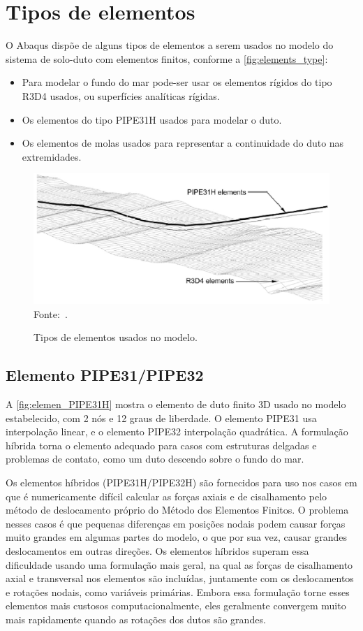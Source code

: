 \section{Tipos de elementos}

O Abaqus dispõe de alguns tipos de elementos a serem usados no modelo do sistema de solo-duto com elementos finitos, conforme a \autoref{fig:elements_type}:

\begin{itemize}
    \item Para modelar o fundo do mar pode-ser usar os elementos rígidos do tipo R3D4 usados, ou superfícies analíticas rígidas.
    \item Os elementos do tipo PIPE31H usados para modelar o duto.
    \item Os elementos de molas usados para representar a continuidade do duto nas extremidades.
\end{itemize}

\begin{figure}[th!]
    \centering
    \caption{Tipos de elementos usados no modelo.}\label{fig:elements_type}
    \includegraphics[width=0.8\linewidth]{imagens/elements_types}
    \\Fonte:~\cite{Bai2014}.
\end{figure}

\subsection{Elemento PIPE31/PIPE32}

A \autoref{fig:elemen_PIPE31H} mostra o elemento de duto finito 3D usado no modelo estabelecido, com 2 nós e 12 graus de liberdade.
O elemento PIPE31 usa interpolação linear, e o elemento PIPE32 interpolação quadrática.
A formulação híbrida torna o elemento adequado para casos com estruturas delgadas e problemas de contato, como um duto descendo sobre o fundo do mar.

Os elementos híbridos (PIPE31H/PIPE32H) são fornecidos para uso nos casos em que é numericamente difícil calcular as forças axiais e de cisalhamento pelo método de deslocamento próprio do Método dos Elementos Finitos.
O problema nesses casos é que pequenas diferenças em posições nodais podem causar forças muito grandes em algumas partes do modelo, o que por sua vez, causar grandes deslocamentos em outras direções.
Os elementos híbridos superam essa dificuldade usando uma formulação mais geral, na qual as forças de cisalhamento axial e transversal nos elementos são incluídas, juntamente com os deslocamentos e rotações nodais, como variáveis primárias.
Embora essa formulação torne esses elementos mais custosos computacionalmente, eles geralmente convergem muito mais rapidamente quando as rotações dos dutos são grandes.

